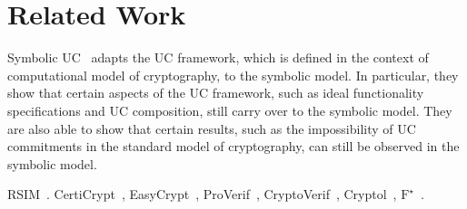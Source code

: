 \section{Related Work}
\label{sec:related}



Symbolic UC~\cite{bohl2016symbolic} adapts the UC framework, which is defined in
the context of computational model of cryptography, to the symbolic model. In
particular, they show that certain aspects of the UC framework, such as ideal
functionality specifications and UC composition, still carry over to the
symbolic model. They are also able to show that certain results, such as the
impossibility of UC commitments in the standard model of cryptography, can still
be observed in the symbolic model.

%

RSIM~\cite{backes2007reactive}. CertiCrypt~\cite{barthe2009formal},
EasyCrypt~\cite{barthe2011computer}, ProVerif~\cite{blanchet2010proverif},
CryptoVerif~\cite{blanchet2007cryptoverif}, Cryptol~\cite{lewis2003cryptol},
$\text{F}^{\star}$~\cite{swamy2016dependent}.

